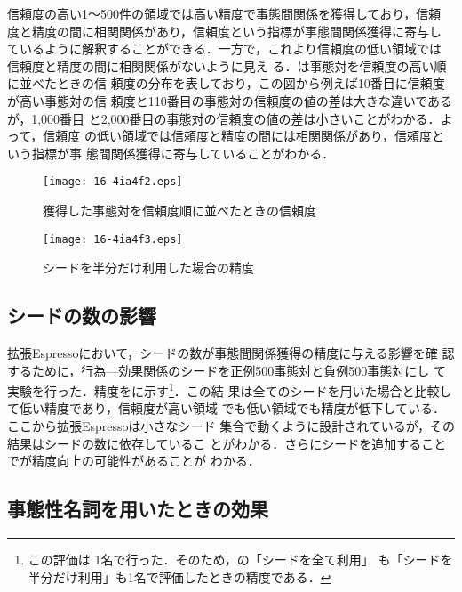 \documentclass[japanese]{jnlp_1.4}
\begin{document}
信頼度の高い1〜500件の領域では高い精度で事態間関係を獲得しており，信頼
度と精度の間に相関関係があり，信頼度という指標が事態間関係獲得に寄与し
ているように解釈することができる．一方で，これより信頼度の低い領域では
信頼度と精度の間に相関関係がないように見え
る．は事態対を信頼度の高い順に並べたときの信
頼度の分布を表しており，この図から例えば10番目に信頼度が高い事態対の信
頼度と110番目の事態対の信頼度の値の差は大きな違いであるが，1,000番目
と2,000番目の事態対の信頼度の値の差は小さいことがわかる．よって，信頼度
の低い領域では信頼度と精度の間には相関関係があり，信頼度という指標が事
態間関係獲得に寄与していることがわかる．

\begin{figure}[p]
\begin{center}
  \texttt{[image: 16-4ia4f2.eps]}
\end{center}
  \caption{獲得した事態対を信頼度順に並べたときの信頼度}
  \label{fig:change_of_reliability}
\end{figure}
\begin{figure}[p]
\begin{center}
  \texttt{[image: 16-4ia4f3.eps]}
\end{center}
  \caption{シードを半分だけ利用した場合の精度}
  \label{fig:using_half_seed}
\end{figure}


\subsection{シードの数の影響}
\label{seed_number}

拡張Espressoにおいて，シードの数が事態間関係獲得の精度に与える影響を確
認するために，行為—効果関係のシードを正例500事態対と負例500事態対にし
て実験を行った．精度をに示す\footnote{この評価は
  1名で行った．そのため，の「シードを全て利用」
  も「シードを半分だけ利用」も1名で評価したときの精度である．}．この結
果は全てのシードを用いた場合と比較して低い精度であり，信頼度が高い領域
でも低い領域でも精度が低下している．ここから拡張Espressoは小さなシード
集合で動くように設計されているが，その結果はシードの数に依存しているこ
とがわかる．さらにシードを追加することでが精度向上の可能性があることが
わかる．



\subsection{事態性名詞を用いたときの効果}
\end{document}
